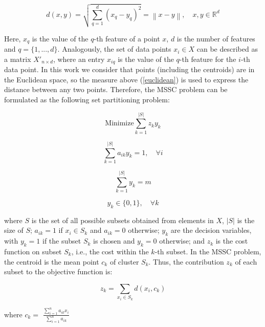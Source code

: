 \begin{equation}
\label{euclidean}
d(x,y) = \sqrt{\sum_{q=1}^{d}(x_{q} - y_{q})^2} = \left \| x - y \right \|, \quad x, y \in \mathbb{R}^d
\end{equation}

Here, $x_{q}$ is the value of the $q$-th feature of a point $x$, $d$ is the number of features and $q = \{1,...,d\}$. Analogously, the set of data points $x_i \in X$ can be described as a matrix $X'_{n \times d}$, where an entry $x_{iq}$ is the value of the $q$-th feature for the $i$-th data point. In this work we consider that points (including the centroids) are in the Euclidean space, so the measure above (\ref{euclidean}) is used to express the distance between any two points. Therefore, the MSSC problem can be formulated as the following set partitioning problem:

\begin{equation} \label{eq:of}
\textrm{Minimize} \sum_{k=1}^{\left | S \right |}z_k y_k
\end{equation}

\begin{equation}
\sum_{k=1}^{\left | S \right |}a_{ik}y_k = 1, \quad \forall i
\end{equation}

\begin{equation}
\sum_{k=1}^{\left | S \right |}y_k = m
\end{equation}

\begin{equation}
y_k \in \{0,1\}, \quad \forall k
\end{equation}

\noindent where $S$ is the set of all possible subsets obtained from elements in $X$, $\left | S \right |$ is the size of $S$; $a_{ik} = 1$ if $x_i \in S_k$ and $a_{ik} = 0$ otherwise; $y_k$ are the decision variables, with $y_k = 1$ if the subset $S_k$ is chosen and $y_k = 0$ otherwise; and $z_k$ is the cost function on subset $S_k$, i.e., the cost within the $k$-th subset. In the MSSC problem, the centroid is the mean point $c_k$ of cluster $S_k$. Thus, the contribution $z_k$ of each subset to the objective function is:

\begin{equation}
z_k = \sum_{x_i \in S_k} d(x_i, c_k)
\end{equation}

\begin{center}
where $c_k = $ \Large $\frac{\sum_{i = 1}^{n}a_{ik}x_i}{\sum_{i = 1}^{n}a_{ik}}$	
\end{center}
	
